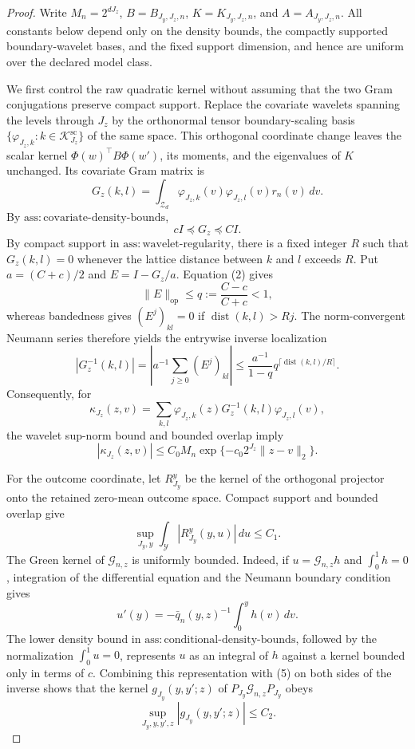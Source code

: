 \documentclass{article}
\begin{document}
\begin{proof}
Write \(M_n=2^{dJ_z}\), \(B=B_{J_y,J_z,n}\), \(K=K_{J_y,J_z,n}\), and \(A=A_{J_y,J_z,n}\). All constants below depend only on the density bounds, the compactly supported boundary-wavelet bases, and the fixed support dimension, and hence are uniform over the declared model class.

We first control the raw quadratic kernel without assuming that the two Gram conjugations preserve compact support. Replace the covariate wavelets spanning the levels through \(J_z\) by the orthonormal tensor boundary-scaling basis \(\{\varphi_{J_z,k}:k\in\mathcal K_{J_z}^{\mathrm{sc}}\}\) of the same space. This orthogonal coordinate change leaves the scalar kernel \(\Phi(w)^{\top}B\Phi(w')\), its moments, and the eigenvalues of \(K\) unchanged. Its covariate Gram matrix is
\[
G_z(k,l)=\int_{\mathcal Z_d}\varphi_{J_z,k}(v)\varphi_{J_z,l}(v)r_n(v)\,dv. \tag{1}
\]
By \(\mathrm{ass{:}covariate\text{-}density\text{-}bounds}\),
\[
cI\preceq G_z\preceq CI. \tag{2}
\]
By compact support in \(\mathrm{ass{:}wavelet\text{-}regularity}\), there is a fixed integer \(R\) such that \(G_z(k,l)=0\) whenever the lattice distance between \(k\) and \(l\) exceeds \(R\). Put \(a=(C+c)/2\) and \(E=I-G_z/a\). Equation (2) gives
\[
\|E\|_{\mathrm{op}}\le q:=\frac{C-c}{C+c}<1,
\]
whereas bandedness gives \((E^j)_{kl}=0\) if \(\operatorname{dist}(k,l)>Rj\). The norm-convergent Neumann series therefore yields the entrywise inverse localization
\[
|G_z^{-1}(k,l)|
=\left|a^{-1}\sum_{j\ge0}(E^j)_{kl}\right|
\le \frac{a^{-1}}{1-q}q^{\lceil\operatorname{dist}(k,l)/R\rceil}. \tag{3}
\]
Consequently, for
\[
\kappa_{J_z}(z,v)=\sum_{k,l}\varphi_{J_z,k}(z)G_z^{-1}(k,l)\varphi_{J_z,l}(v),
\]
the wavelet sup-norm bound and bounded overlap imply
\[
|\kappa_{J_z}(z,v)|
\le C_0M_n\exp\{-c_0 2^{J_z}\|z-v\|_2\}. \tag{4}
\]

For the outcome coordinate, let \(R^y_{J_y}\) be the kernel of the orthogonal projector onto the retained zero-mean outcome space. Compact support and bounded overlap give
\[
\sup_{J_y,y}\int_{\mathcal Y}|R^y_{J_y}(y,u)|\,du\le C_1. \tag{5}
\]
The Green kernel of \(\mathcal G_{n,z}\) is uniformly bounded. Indeed, if \(u=\mathcal G_{n,z}h\) and \(\int_0^1h=0\), integration of the differential equation and the Neumann boundary condition gives
\[
u'(y)=-\bar q_n(y,z)^{-1}\int_0^yh(v)\,dv.
\]
The lower density bound in \(\mathrm{ass{:}conditional\text{-}density\text{-}bounds}\), followed by the normalization \(\int_0^1u=0\), represents \(u\) as an integral of \(h\) against a kernel bounded only in terms of \(c\). Combining this representation with (5) on both sides of the inverse shows that the kernel \(g_{J_y}(y,y';z)\) of \(P_{J_y}\mathcal G_{n,z}P_{J_y}\) obeys
\[
\sup_{J_y,y,y',z}|g_{J_y}(y,y';z)|\le C_2. \tag{6}
\]


\end{proof}
\end{document}

